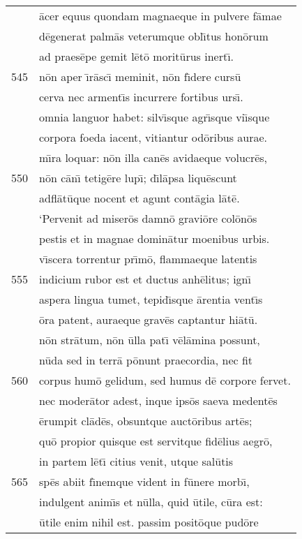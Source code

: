 \documentclass[paper=6in:9in,pagesize=pdftex,
               headinclude=on,footinclude=on,12pt]{scrbook}
\begin{document}
\begin{longtable}[p]{ r l }
 & \=acer equus quondam magnaeque in pulvere f\=amae\\ 
 & d\=egenerat palm\=as veterumque obl\={\i}tus hon\=orum\\ 
 & ad praes\=epe gemit l\=et\=o morit\=urus inert\={\i}.\\ 
545 & n\=on aper \={\i}r\=asc\={\i} meminit, n\=on f\={\i}dere curs\=u\\ 
 & cerva nec arment\={\i}s incurrere fortibus urs\={\i}.\\ 
 & omnia languor habet: silv\={\i}sque agr\={\i}sque vi\={\i}sque\\ 
 & corpora foeda iacent, vitiantur od\=oribus aurae.\\ 
 & m\={\i}ra loquar: n\=on illa can\=es avidaeque volucr\=es,\\ 
550 & n\=on c\=an\={\i} tetig\=ere lup\={\i}; d\={\i}l\=apsa liqu\=escunt\\ 
 & adfl\=at\=uque nocent et agunt cont\=agia l\=at\=e.\\ 
 & \indent `Pervenit ad miser\=os damn\=o gravi\=ore col\=on\=os\\ 
 & pestis et in magnae domin\=atur moenibus urbis.\\ 
 & v\={\i}scera torrentur pr\={\i}m\=o, flammaeque latentis\\ 
555 & indicium rubor est et ductus anh\=elitus; ign\={\i}\\ 
 & aspera lingua tumet, tepid\={\i}sque \=arentia vent\={\i}s\\ 
 & \=ora patent, auraeque grav\=es captantur hi\=at\=u.\\ 
 & n\=on str\=atum, n\=on \=ulla pat\={\i} v\=el\=amina possunt,\\ 
 & n\=uda sed in terr\=a p\=onunt praecordia, nec fit\\ 
560 & corpus hum\=o gelidum, sed humus d\=e corpore fervet.\\ 
 & nec moder\=ator adest, inque ips\=os saeva medent\=es\\ 
 & \=erumpit cl\=ad\=es, obsuntque auct\=oribus art\=es;\\ 
 & qu\=o propior quisque est servitque fid\=elius aegr\=o,\\ 
 & in partem l\=et\={\i} citius venit, utque sal\=utis\\ 
565 & sp\=es abiit f\={\i}nemque vident in f\=unere morb\={\i},\\ 
 & indulgent anim\={\i}s et n\=ulla, quid \=utile, c\=ura est:\\ 
 & \=utile enim nihil est. passim posit\=oque pud\=ore\\ 

\end{longtable}
\end{document}
